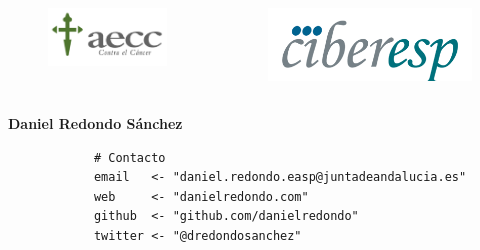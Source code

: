 \documentclass{beamer}
\begin{document}
\begin{frame}[fragile]
\begin{columns}
\begin{column}{0.33\textwidth}
		\begin{figure}
			\centering
			\includegraphics[width=.7\textwidth]{logos/logo_aecc.png}
		\end{figure}
	\end{column}
	\begin{column}{0.33\textwidth}
		\begin{figure}
			\centering
			\includegraphics[width=.7\textwidth]{logos/logo_ciber.png}
		\end{figure}
	\end{column}
\end{columns}

	\bigskip
	
	\vspace{20pt}
		
	\centering
	\Large
	\textbf{Daniel Redondo Sánchez}
	
	\bigskip


	\normalsize{
		\begin{verbatim}
			# Contacto
			email   <- "daniel.redondo.easp@juntadeandalucia.es"
			web     <- "danielredondo.com"
			github  <- "github.com/danielredondo"
			twitter <- "@dredondosanchez"
		\end{verbatim}
		
		
%		

}
\end{frame}
\end{document}
